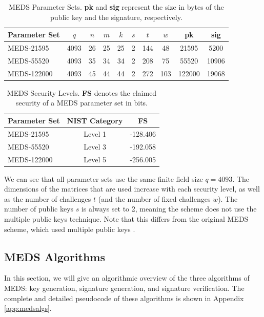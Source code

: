 \documentclass[11pt,a4paper]{report}
\theoremstyle{definition}
\begin{document}
\begin{table}
  \centering
  \begin{tabular}{lccccccccc}
    \toprule
    \textbf{Parameter Set} & \textbf{$q$} & \textbf{$n$} & \textbf{$m$} & \textbf{$k$} & \textbf{$s$} & \textbf{$t$} & \textbf{$w$} & \textbf{pk} & \textbf{sig} \\
    \midrule
    MEDS-21595 & 4093 & 26 & 25 & 25 & 2 & 144 & 48 & 21595 & 5200 \\
    MEDS-55520 & 4093 & 35 & 34 & 34 & 2 & 208 & 75 & 55520 & 10906 \\
    MEDS-122000 & 4093 & 45 & 44 & 44 & 2 & 272 & 103 & 122000 & 19068 \\
    \bottomrule
  \end{tabular}
  \caption{MEDS Parameter Sets. \textbf{pk} and \textbf{sig} represent the size in bytes of the public key and the signature, respectively.}
  \label{tab:medsparametersets}
\end{table}

\begin{table}
  \centering
  \begin{tabular}{lcc}
    \toprule
    \textbf{Parameter Set} & \textbf{NIST Category} & \textbf{FS} \\
    \midrule
    MEDS-21595 & Level 1 & -128.406 \\
    MEDS-55520 & Level 3 & -192.058 \\
    MEDS-122000 & Level 5 & -256.005 \\
    \bottomrule
  \end{tabular}
  \caption{MEDS Security Levels. \textbf{FS} denotes the claimed security of a MEDS parameter set in bits.}
  \label{tab:medssecuritylevels}
\end{table}

We can see that all parameter sets use the same finite field size $q = 4093$. The dimensions of the matrices that are used increase with each security level, as well as the number of challenges $t$ (and the number of fixed challenges $w$). The number of public keys $s$ is always set to 2, meaning the scheme does not use the multiple public keys technique. Note that this differs from the original MEDS scheme, which used multiple public keys \cite{chou2023meds}.

\subsection{MEDS Algorithms}
\label{sec:medsalgorithms}
In this section, we will give an algorithmic overview of the three algorithms of MEDS: key generation, signature generation, and signature verification. The complete and detailed pseudocode of these algorithms is shown in Appendix \ref{app:medsalgs}.
\end{document}
